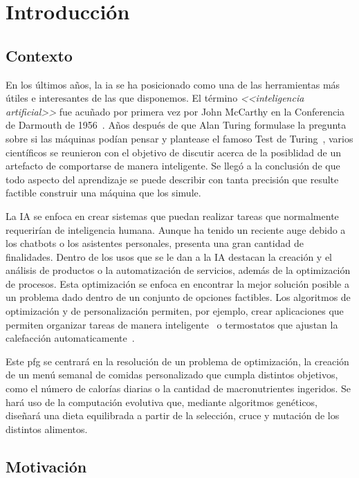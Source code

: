 \chapter{Introducción}
\label{ch:introduccion}

\section{Contexto}
En los últimos años, la \gls{ia} se ha posicionado como una de las herramientas más útiles e interesantes de las que disponemos. El término \textit{<<inteligencia artificial>>} fue acuñado por primera vez por John McCarthy en la Conferencia de Darmouth de 1956~\cite{dartmouth1956}. Años después de que Alan Turing formulase la pregunta sobre si las máquinas podían pensar y plantease el famoso Test de Turing~\cite{turing1950}, varios científicos se reunieron con el objetivo de discutir acerca de la posiblidad de un artefacto de comportarse de manera inteligente. Se llegó a la conclusión de que todo aspecto del aprendizaje se puede describir con tanta precisión que resulte factible construir una máquina que los simule.

La IA se enfoca en crear sistemas que puedan realizar tareas que normalmente requerirían de inteligencia humana. Aunque ha tenido un reciente auge debido a los chatbots o los asistentes personales, presenta una gran cantidad de finalidades. Dentro de los usos que se le dan a la IA destacan la creación y el análisis de productos o la automatización de servicios, además de la optimización de procesos. Esta optimización se enfoca en encontrar la mejor solución posible a un problema dado dentro de un conjunto de opciones factibles. Los algoritmos de optimización y de personalización permiten, por ejemplo, crear aplicaciones que permiten organizar tareas de manera inteligente~\cite{todoist2024} o termostatos que ajustan la calefacción automaticamente~\cite{googlenest2020}.

Este \gls{pfg} se centrará en la resolución de un problema de optimización, la creación de un menú semanal de comidas personalizado que cumpla distintos objetivos, como el número de calorías diarias o la cantidad de macronutrientes ingeridos. Se hará uso de la computación evolutiva que, mediante algoritmos genéticos, diseñará una dieta equilibrada a partir de la selección, cruce y mutación de los distintos alimentos.


\section{Motivación}

